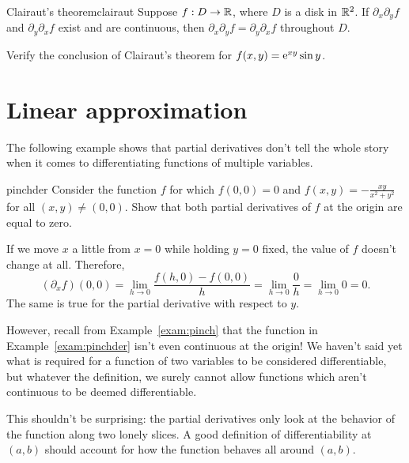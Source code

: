 \documentclass{watsonbook}
\begin{document}
\begin{theo}{Clairaut's theorem}{clairaut}
  Suppose $f:D \to \mathbb{R}$, where $D$ is a disk in $\mathbb{R}^2$. If
  $\partial_x \partial_y f$ and $\partial_y \partial_x f$ exist and
  are continuous, then $\partial_x \partial_y f = \partial_y
  \partial_x f$ throughout $D$. 
\end{theo}

\begin{exercise}{}{}
  Verify the conclusion of Clairaut's theorem for $f(x,y) = \mathrm{e}^{xy}
  \sin y$. 
\end{exercise}

\section{Linear approximation} \label{sec:linapprox} 


The following example shows that partial derivatives don't tell the
whole story when it comes to differentiating functions of multiple
variables.

\begin{example}{}{pinchder}
  Consider the function $f$ for which $f(0,0)=0$ and $f(x,y) =
  -\frac{xy}{x^2 + y^2}$ for all $(x,y) \neq (0,0)$. Show that both
  partial derivatives of $f$ at the origin are equal to zero. 
\end{example}

\begin{solution}
  If we move $x$ a little from $x=0$ while holding $y=0$ fixed, the
  value of $f$ doesn't change at all. Therefore,
  \[
    (\partial_x f)(0,0) = \lim_{h \to 0} \frac{f(h,0) - f(0,0)}{h} =
    \lim_{h \to 0} \frac{0}{h} =  \lim_{h \to 0} 0 = 0. 
  \]
  The same is true for the partial derivative with respect to $y$. 
\end{solution}

However, recall from Example~\ref{exam:pinch} that the function in
Example~\ref{exam:pinchder} isn't even continuous at the origin! We
haven't said yet what is required for a function of two variables to be
considered differentiable, but whatever the definition, we surely cannot allow
functions which aren't continuous to be deemed differentiable. 

This shouldn't be surprising: the partial derivatives only look at the
behavior of the function along two lonely slices. A good definition of
differentiability at $(a,b)$ should account for how the function
behaves all around $(a,b)$.
\end{document}
